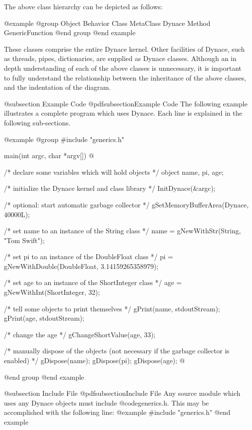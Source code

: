 The above class hierarchy can be depicted as follows:

@example
@group
     Object
          Behavior
               Class
               MetaClass
          Dynace
          Method
          GenericFunction
@end group
@end example

These classes comprise the entire Dynace kernel.  Other facilities of Dynace,
such as threads, pipes, dictionaries, are supplied as Dynace classes.
Although an in depth understanding of each of the above classes is
unnecessary, it is important to fully understand the relationship between
the inheritance of the above classes, and the indentation of the diagram.

@subsection Example Code
@pdfsubsection{Example Code}
The following example illustrates a complete program which uses Dynace.
Each line is explained in the following sub-sections.

@example
@group
#include "generics.h"

main(int argc, char *argv[])
@{
        /*  declare some variables which will hold objects  */
        object  name, pi, age;

        /*  initialize the Dynace kernel and class library  */
        InitDynace(&argc);

        /*  optional:  start automatic garbage collector  */
        gSetMemoryBufferArea(Dynace, 40000L);


        /*  set name to an instance of the String class  */
        name = gNewWithStr(String, "Tom Swift");

        /*  set pi to an instance of the DoubleFloat class  */
        pi   = gNewWithDouble(DoubleFloat, 3.14159265358979);

        /*  set age to an instance of the ShortInteger class  */
        age  = gNewWithInt(ShortInteger, 32);

        /*  tell some objects to print themselves  */
        gPrint(name, stdoutStream);
        gPrint(age, stdoutStream);

        /*  change the age  */
        gChangeShortValue(age, 33);
        


        /*  manually dispose of the objects (not necessary if the
            garbage collector is enabled)  */
        gDispose(name);
        gDispose(pi);
        gDispose(age);
@}
@end group
@end example

@subsection Include File
@pdfsubsection{Include File}
Any source module which uses any Dynace objects must include @code{generics.h}.
This may be accomplished with the following line:
@example
#include "generics.h"
@end example

